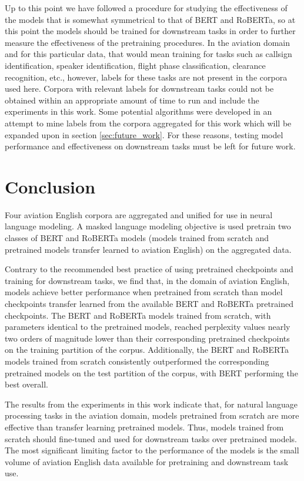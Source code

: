 \documentclass[12pt]{article}
\begin{document}
Up to this point we have followed a procedure for studying the effectiveness of the models that is somewhat symmetrical to that of BERT and RoBERTa,
so at this point the models should be trained for downstream tasks in order to further measure the effectiveness of the pretraining procedures.
In the aviation domain and for this particular data, that would mean training for tasks such as callsign identification, speaker identification,
flight phase classification, clearance recognition, etc., however, labels for these tasks are not present in the corpora used here. Corpora with
relevant labels for downstream tasks could not be obtained within an appropriate amount of time to run and include the experiments in this work.
Some potential algorithms were developed in an attempt to mine labels from the corpora aggregated for this work which will be expanded upon in section
\ref{sec:future_work}. For these reasons, testing model performance and effectiveness on downstream tasks must be left for future work.

\section{Conclusion}\label{sec:conclusion}
Four aviation English corpora are aggregated and unified for use in neural language modeling. A masked language modeling objective is used pretrain
two classes of BERT and RoBERTa models (models trained from scratch and pretrained models transfer learned to aviation English) on the aggregated
data.

Contrary to the recommended best practice of using pretrained checkpoints and training for downstream tasks, we find that, in the domain of aviation
English, models achieve better performance when pretrained from scratch than model checkpoints transfer learned from the available BERT and RoBERTa
pretrained checkpoints. The BERT and RoBERTa models trained from scratch, with parameters identical to the pretrained models, reached perplexity
values nearly two orders of magnitude lower than their corresponding pretrained checkpoints on the training partition of the corpus. Additionally,
the BERT and RoBERTa models trained from scratch consistently outperformed the corresponding pretrained models on the test partition of the corpus,
with BERT performing the best overall.

The results from the experiments in this work indicate that, for natural language processing tasks in the aviation domain, models pretrained from
scratch are more effective than transfer learning pretrained models. Thus, models trained from scratch should fine-tuned and used for downstream tasks
over pretrained models. The most significant limiting factor to the performance of the models is the small volume of aviation English data available
for pretraining and downstream task use.
\end{document}
